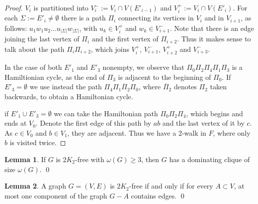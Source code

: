 \documentclass{amsart}
\theoremstyle{definition}
\newtheorem{lemma}{Lemma}
\begin{document}
\begin{proof}
$V_i$ is partitioned into
$V_i^-:= V_i\cap V(E'_{i-1})$ and 
$V_i^+:= V_i\cap V(E'_{i})$. For each $\Sigma:=E'_i\neq\emptyset$ there is
a path $\Pi_i$ connecting its vertices in $V_i$ and in $V_{i+1}$, 
as follows: $u_1 w_1 u_2\dots u_{|\Sigma|}w_{|\Sigma|}$, with 
$u_k\in V_i^+$ and $w_k\in V_{i+1}^-$.%
Note that there is an edge joining the last vertex of $\Pi_i$ and
the first vertex of $\Pi_{i+2}$. Thus it makes sense to talk about the path
$\Pi_i\Pi_{i+2}$, which joins $V_i^+$, $V_{i+1}^-$, $V_{i+2}^+$ and
$V_{i+3}^-$.

In the case of both $E'_1$ and $E'_3$ nonempty, we observe that 
$\Pi_0\Pi_2\Pi_4\Pi_1\Pi_3$ is a Hamiltionian cycle, as the end of
$\Pi_3$ is adjacent to the beginning of $\Pi_0$. 
If $E'_3=\emptyset$  
we use instead the path 
$\Pi_4\Pi_1\overline{\Pi}_2\Pi_0$, where $\overline{\Pi}_2$
denotes $\Pi_2$ taken backwards, to obtain a Hamiltonian
cycle.

if $E'_1\cup E'_3=\emptyset$ 
we can take the Hamiltonian path $\Pi_0\Pi_2\Pi_4$, 
which begins and ends at $V_0$. Denote the first
edge of this path by $ab$ and the last vertex of it 
by $c$. As $c\in V_0$ and $b\in V_1$, they are adjacent.
Thus we have a 2-walk in $F$, where only $b$ is visited
twice.
\end{proof}

\begin{lemma}\label{lm2}{\cite[Theorem 3]{chung1990maximum}}
If $G$ is $2K_2$-free with $\omega(G)\ge3$, then $G$ has a dominating clique of size $\omega(G)$. \qed
\end{lemma}

\begin{lemma}\label{lm3}{\cite[Observation 1]{broersma2014toughness}}
A graph $G=(V,E)$ is $2K_2$-free if and only if for every $A\subset V$, at most one component of the graph $G-A$ contains edges. \qed
\end{lemma}
\end{document}
